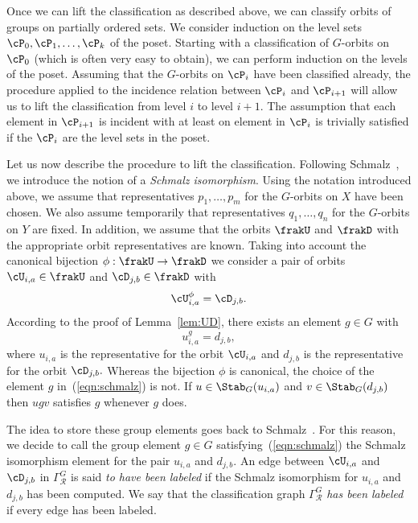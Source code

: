 Once we can lift the classification as described above, 
we can classify orbits of groups on partially ordered sets.
We consider induction on the level sets
$\cP_0, \cP_1, \ldots, \cP_k$ of the poset. 
Starting with a classification of $G$-orbits on $\cP_0$ (which is often very easy to obtain), 
we can perform induction on the levels of the poset.
Assuming that the $G$-orbits on $\cP_i$ have been classified already, 
the procedure applied to the incidence relation 
between $\cP_i$ and $\cP_{i+1}$ will allow us to lift the classification from level $i$ to level $i+1.$ 
The assumption that each element in $\cP_{i+1}$ is incident with at least on element in $\cP_i$ 
is trivially satisfied if the $\cP_i$ are the level sets in the poset. 

  

\bigskip

Let us now describe the procedure to lift the classification.
Following Schmalz~\cite{Schmalz90}, we introduce the notion of a {\em Schmalz isomorphism}.
Using the notation introduced above, we assume that 
representatives $p_1,\ldots, p_m$ for the $G$-orbits on $X$ have been chosen.
We also assume temporarily that representatives $q_1,\ldots, q_n$ for the $G$-orbits on $Y$ are fixed.
In addition, we assume that the orbits $\frakU$ and $\frakD$ with the appropriate orbit representatives 
are known. Taking into account the canonical bijection $\phi: \frakU \rightarrow \frakD$
we consider a pair 
of orbits $\cU_{i,a} \in \frakU$ and $\cD_{j,b}\in\frakD$ with 
\begin{equation}\label{eqn:phi}
\cU_{i,a}^\phi = \cD_{j,b}.
\end{equation}
According to the proof of Lemma~\ref{lem:UD}, 
there exists an element $g \in G$ with 
\begin{equation}\label{eqn:schmalz}
u_{i,a}^g = d_{j,b},
\end{equation}
where $u_{i,a}$ is the representative for the orbit $\cU_{i,a}$ and 
$d_{j,b}$ is the representative for the orbit $\cD_{j,b}.$  
Whereas the bijection $\phi$ is canonical, the choice 
of the element  $g$ in~(\ref{eqn:schmalz}) is not. 
If $u \in \Stab_{G}(u_{i,a})$ and $v \in \Stab_G(d_{j,b})$ 
then $ugv$ satisfies $g$ whenever $g$ does.


\bigskip



The idea to store these group elements goes back to Schmalz~\cite{Schmalz90}.
For this reason, we decide to call the group element $g \in G$ satisfying~(\ref{eqn:schmalz}) 
the Schmalz isomorphism element for the pair $u_{i,a}$ and $d_{j,b}.$ 
An edge between $\cU_{i,a}$ and $\cD_{j,b}$ 
in $\Gamma_{\mathcal R}^G$ is said {\em to have been labeled} 
if the Schmalz isomorphism 
for $u_{i,a}$ and $d_{j,b}$ has been computed.
We say that the classification graph $\Gamma_{\mathcal R}^G$ {\em has been labeled}
if every edge has been labeled. 




